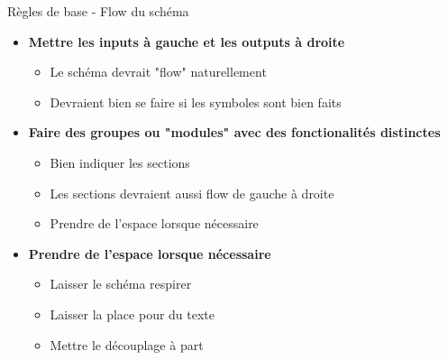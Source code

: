 \begin{frame}{Règles de base - Flow du schéma}
    \begin{itemize}
        \item \textbf{Mettre les inputs à gauche et les outputs à droite}
        \begin{itemize}
            \item Le schéma devrait "flow" naturellement
            \item Devraient bien se faire si les symboles sont bien faits
        \end{itemize}
        \bigskip
        \item \textbf{Faire des groupes ou "modules" avec des fonctionalités distinctes}
        \begin{itemize}
            \item Bien indiquer les sections
            \item Les sections devraient aussi flow de gauche à droite
            \item Prendre de l'espace lorsque nécessaire
        \end{itemize}
        \bigskip
        \item \textbf{Prendre de l'espace lorsque nécessaire}
        \begin{itemize}
            \item Laisser le schéma respirer
            \item Laisser la place pour du texte
            \item Mettre le découplage à part
        \end{itemize}
    \end{itemize}
\end{frame}

